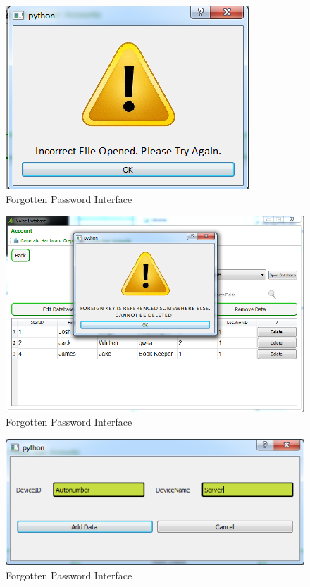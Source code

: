 \begin{figure}[H]
    \includegraphics[width=\textwidth]{./Testing/Images/IncorrectFileError.png}
    \caption{Forgotten Password Interface} \label{fig:IncorrectFileError}
\end{figure}

\begin{figure}[H]
    \includegraphics[width=\textwidth]{./Testing/Images/DialogNoClickAway.png}
    \caption{Forgotten Password Interface} \label{fig:DialogNoClickAway}
\end{figure}

\begin{figure}[H]
    \includegraphics[width=\textwidth]{./Testing/Images/Dev.png}
    \caption{Forgotten Password Interface} \label{fig:Dev}
\end{figure}

